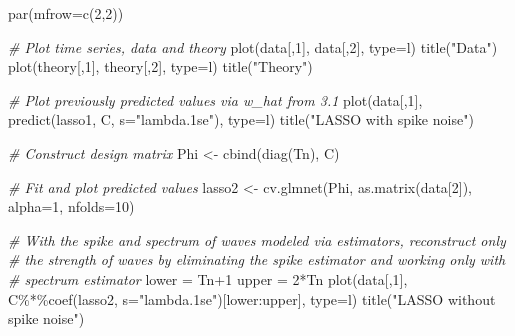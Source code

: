 \documentclass[
]{article}
\newenvironment{Shaded}{\begin{snugshade}}{\end{snugshade}}
\newcommand{\AttributeTok}[1]{\textcolor[rgb]{0.77,0.63,0.00}{#1}}
\newcommand{\CommentTok}[1]{\textcolor[rgb]{0.56,0.35,0.01}{\textit{#1}}}
\newcommand{\DecValTok}[1]{\textcolor[rgb]{0.00,0.00,0.81}{#1}}
\newcommand{\FunctionTok}[1]{\textcolor[rgb]{0.00,0.00,0.00}{#1}}
\newcommand{\NormalTok}[1]{#1}
\newcommand{\OtherTok}[1]{\textcolor[rgb]{0.56,0.35,0.01}{#1}}
\newcommand{\SpecialCharTok}[1]{\textcolor[rgb]{0.00,0.00,0.00}{#1}}
\newcommand{\StringTok}[1]{\textcolor[rgb]{0.31,0.60,0.02}{#1}}
\begin{document}
\begin{Shaded}
\begin{Highlighting}[]
\FunctionTok{par}\NormalTok{(}\AttributeTok{mfrow=}\FunctionTok{c}\NormalTok{(}\DecValTok{2}\NormalTok{,}\DecValTok{2}\NormalTok{))}

\CommentTok{\# Plot time series, data and theory}
\FunctionTok{plot}\NormalTok{(data[,}\DecValTok{1}\NormalTok{], data[,}\DecValTok{2}\NormalTok{], }\AttributeTok{type=}\StringTok{\textquotesingle{}l\textquotesingle{}}\NormalTok{)}
\FunctionTok{title}\NormalTok{(}\StringTok{"Data"}\NormalTok{)}
\FunctionTok{plot}\NormalTok{(theory[,}\DecValTok{1}\NormalTok{], theory[,}\DecValTok{2}\NormalTok{], }\AttributeTok{type=}\StringTok{\textquotesingle{}l\textquotesingle{}}\NormalTok{)}
\FunctionTok{title}\NormalTok{(}\StringTok{"Theory"}\NormalTok{)}

\CommentTok{\# Plot previously predicted values via w\_hat from 3.1}
\FunctionTok{plot}\NormalTok{(data[,}\DecValTok{1}\NormalTok{], }\FunctionTok{predict}\NormalTok{(lasso1, C, }\AttributeTok{s=}\StringTok{"lambda.1se"}\NormalTok{), }\AttributeTok{type=}\StringTok{\textquotesingle{}l\textquotesingle{}}\NormalTok{)}
\FunctionTok{title}\NormalTok{(}\StringTok{"LASSO with spike noise"}\NormalTok{)}

\CommentTok{\# Construct design matrix}
\NormalTok{Phi }\OtherTok{\textless{}{-}} \FunctionTok{cbind}\NormalTok{(}\FunctionTok{diag}\NormalTok{(Tn), C)}

\CommentTok{\# Fit and plot predicted values}
\NormalTok{lasso2 }\OtherTok{\textless{}{-}} \FunctionTok{cv.glmnet}\NormalTok{(Phi, }\FunctionTok{as.matrix}\NormalTok{(data[}\DecValTok{2}\NormalTok{]), }\AttributeTok{alpha=}\DecValTok{1}\NormalTok{, }\AttributeTok{nfolds=}\DecValTok{10}\NormalTok{)}

\CommentTok{\# With the spike and spectrum of waves modeled via estimators, reconstruct only }
\CommentTok{\# the strength of waves by eliminating the spike estimator and working only with}
\CommentTok{\# spectrum estimator}
\NormalTok{lower }\OtherTok{=}\NormalTok{ Tn}\SpecialCharTok{+}\DecValTok{1}
\NormalTok{upper }\OtherTok{=} \DecValTok{2}\SpecialCharTok{*}\NormalTok{Tn}
\FunctionTok{plot}\NormalTok{(data[,}\DecValTok{1}\NormalTok{], C}\SpecialCharTok{\%*\%}\FunctionTok{coef}\NormalTok{(lasso2, }\AttributeTok{s=}\StringTok{"lambda.1se"}\NormalTok{)[lower}\SpecialCharTok{:}\NormalTok{upper], }\AttributeTok{type=}\StringTok{\textquotesingle{}l\textquotesingle{}}\NormalTok{)}
\FunctionTok{title}\NormalTok{(}\StringTok{"LASSO without spike noise"}\NormalTok{)}
\end{Highlighting}
\end{Shaded}
\end{document}
